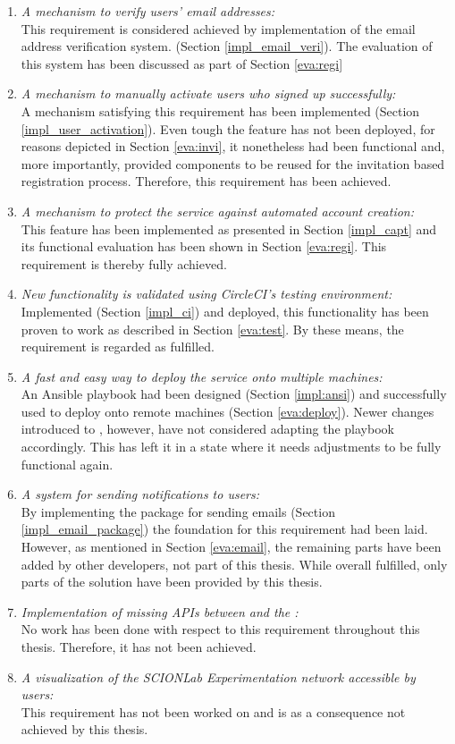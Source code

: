 \begin{enumerate}  
	\item\textit{A mechanism to verify users' email addresses:}\\	
		This requirement is considered achieved by implementation of the email address verification system. (Section \ref{impl_email_veri}). The evaluation of this system has been discussed as part of Section \ref{eva:regi}
	\item\textit{A mechanism to manually activate users who signed up successfully:}\\
		A mechanism satisfying this requirement has been implemented (Section \ref{impl_user_activation}). Even tough the feature has not been deployed, for reasons depicted in Section \ref{eva:invi}, it nonetheless had been functional and, more importantly, provided components to be reused for the invitation based registration process. Therefore, this requirement has been achieved.
	\item\textit{A mechanism to protect the service against automated account creation:}\\
		This feature has been implemented as presented in Section \ref{impl_capt} and its functional evaluation has been shown in Section \ref{eva:regi}. This requirement is thereby fully achieved.
	\item\textit{New functionality is validated using CircleCI's testing environment:}\\
		Implemented (Section \ref{impl_ci}) and deployed, this functionality has been proven to work as described in Section \ref{eva:test}. By these means, the requirement is regarded as fulfilled.
	\item\textit{A fast and easy way to deploy the service onto multiple machines:}\\
		An Ansible playbook had been designed (Section \ref{impl:ansi}) and successfully used to deploy \lcs onto remote machines (Section \ref{eva:deploy}). Newer changes introduced to \lcs, however, have not considered adapting the playbook accordingly. This has left it in a state where it needs adjustments to be fully functional again. 
	\item\textit{A system for sending notifications to users:}\\
		By implementing the package for sending emails (Section \ref{impl_email_package}) the foundation for this requirement had been laid. However, as mentioned in Section \ref{eva:email}, the remaining parts have been added by other developers, not part of this thesis. While overall fulfilled, only parts of the solution have been provided by this thesis.
	\item\textit{Implementation of missing APIs between \cords and the \lmi:}\\
		No work has been done with respect to this requirement throughout this thesis. Therefore, it has not been achieved.
	\item\textit{A visualization of the SCIONLab Experimentation network accessible by users:}\\
		This requirement has not been worked on and is as a consequence not achieved by this thesis.
\end{enumerate}

